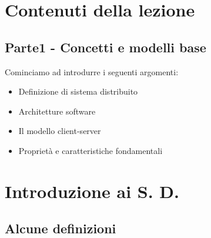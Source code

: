 \chapter{Contenuti della lezione}

\section{Parte1 - Concetti e modelli base}
Cominciamo ad introdurre i seguenti argomenti:
\begin{itemize}
    \item Definizione di sistema distribuito
    \item Architetture software
    \item Il modello client-server
    \item Proprietà e caratteristiche fondamentali    
\end{itemize}


\chapter{Introduzione ai S. D.}
\section{Alcune definizioni}
